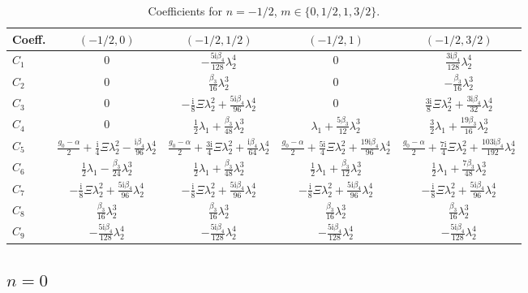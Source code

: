 \documentclass[11pt]{article}
\newcommand{\ii}{\mathrm{i}}
\begin{document}
\begin{table}[htbp]
\centering\small
\caption{Coefficients for $n=-1/2$, $m\in\{0,1/2,1,3/2\}$.}
\begin{tabular}{lcccc}
\toprule
Coeff. & $(-1/2,0)$ & $(-1/2,1/2)$ & $(-1/2,1)$ & $(-1/2,3/2)$ \\
\midrule
$C_1$ & $0$ & $-\tfrac{5\ii\beta_4}{128}\lambda_2^4$ & $0$ & $\tfrac{3\ii\beta_4}{128}\lambda_2^4$ \\
$C_2$ & $0$ & $\tfrac{\beta_3}{16}\lambda_2^3$ & $0$ & $-\tfrac{\beta_3}{16}\lambda_2^3$ \\
$C_3$ & $0$ & $-\tfrac{\ii}{8}\Xi\lambda_2^2+\tfrac{5\ii\beta_4}{96}\lambda_2^4$ & $0$ & $\tfrac{3\ii}{8}\Xi\lambda_2^2+\tfrac{3\ii\beta_4}{32}\lambda_2^4$ \\
$C_4$ & $0$ & $\tfrac12\lambda_1+\tfrac{\beta_3}{48}\lambda_2^3$ & $\lambda_1+\tfrac{5\beta_3}{12}\lambda_2^3$ & $\tfrac32\lambda_1+\tfrac{19\beta_3}{16}\lambda_2^3$ \\
$C_5$ & $\tfrac{g_0-\alpha}{2}+\tfrac{\ii}{4}\Xi\lambda_2^2-\tfrac{\ii\beta_4}{96}\lambda_2^4$ & $\tfrac{g_0-\alpha}{2}+\tfrac{3\ii}{4}\Xi\lambda_2^2+\tfrac{\ii\beta_4}{64}\lambda_2^4$ & $\tfrac{g_0-\alpha}{2}+\tfrac{5\ii}{4}\Xi\lambda_2^2+\tfrac{19\ii\beta_4}{96}\lambda_2^4$ & $\tfrac{g_0-\alpha}{2}+\tfrac{7\ii}{4}\Xi\lambda_2^2+\tfrac{103\ii\beta_4}{192}\lambda_2^4$ \\
$C_6$ & $\tfrac12\lambda_1-\tfrac{\beta_3}{24}\lambda_2^3$ & $\tfrac12\lambda_1+\tfrac{\beta_3}{48}\lambda_2^3$ & $\tfrac12\lambda_1+\tfrac{\beta_3}{12}\lambda_2^3$ & $\tfrac12\lambda_1+\tfrac{7\beta_3}{48}\lambda_2^3$ \\
$C_7$ & $-\tfrac{\ii}{8}\Xi\lambda_2^2+\tfrac{5\ii\beta_4}{96}\lambda_2^4$ & $-\tfrac{\ii}{8}\Xi\lambda_2^2+\tfrac{5\ii\beta_4}{96}\lambda_2^4$ & $-\tfrac{\ii}{8}\Xi\lambda_2^2+\tfrac{5\ii\beta_4}{96}\lambda_2^4$ & $-\tfrac{\ii}{8}\Xi\lambda_2^2+\tfrac{5\ii\beta_4}{96}\lambda_2^4$ \\
$C_8$ & $\tfrac{\beta_3}{16}\lambda_2^3$ & $\tfrac{\beta_3}{16}\lambda_2^3$ & $\tfrac{\beta_3}{16}\lambda_2^3$ & $\tfrac{\beta_3}{16}\lambda_2^3$ \\
$C_9$ & $-\tfrac{5\ii\beta_4}{128}\lambda_2^4$ & $-\tfrac{5\ii\beta_4}{128}\lambda_2^4$ & $-\tfrac{5\ii\beta_4}{128}\lambda_2^4$ & $-\tfrac{5\ii\beta_4}{128}\lambda_2^4$ \\
\bottomrule
\end{tabular}
\end{table}

\subsection{$n=0$}
\end{document}
